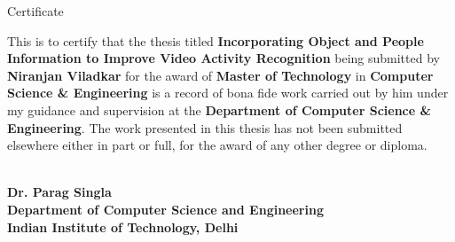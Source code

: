\begin{center}
\LARGE{ Certificate} 
\end{center}

\vspace{0.5in}

This is to certify that the thesis titled {\bfseries Incorporating Object and People Information to Improve Video Activity Recognition} being submitted by
{\bfseries Niranjan Viladkar} for the award of {\bfseries Master of Technology} in {\bfseries Computer Science \& Engineering} 
is a record of bona fide work carried out by him under my guidance and supervision at the {\bfseries Department of Computer Science \& Engineering}. 
The work presented in this thesis has not been submitted elsewhere either in part or full, for the award of any other degree or diploma.

\vspace{1.5in}

\underline{\hspace{5cm}}\\
{\bfseries Dr. Parag Singla} \\
{\bfseries Department of Computer Science and Engineering} \\
{\bfseries Indian Institute of Technology, Delhi}\\ 
